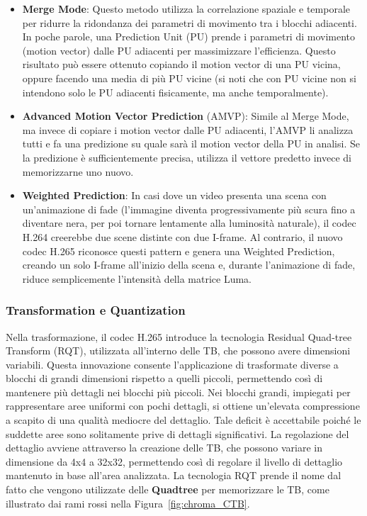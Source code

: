 \documentclass[a4paper,12pt, oneside]{article}
\begin{document}
\begin{itemize}
    \item \textbf{Merge Mode}: Questo metodo utilizza la correlazione spaziale e temporale per ridurre la
    ridondanza dei parametri di movimento tra i blocchi adiacenti. In poche parole, una Prediction Unit
    (PU) prende i parametri di movimento (motion vector) dalle PU adiacenti per massimizzare l'efficienza.
    Questo risultato può essere ottenuto copiando il motion vector di una PU vicina, oppure facendo una
    media di più PU vicine (si noti che con PU vicine non si intendono solo le PU adiacenti fisicamente, ma
    anche temporalmente).
    \item \textbf{Advanced Motion Vector Prediction} (AMVP): Simile al Merge Mode, ma invece di copiare i
    motion vector dalle PU adiacenti, l'AMVP li analizza tutti e fa una predizione su quale sarà il motion
    vector della PU in analisi. Se la predizione è sufficientemente precisa, utilizza il vettore predetto
    invece di memorizzarne uno nuovo.
    \item \textbf{Weighted Prediction}: In casi dove un video presenta una scena con un'animazione di fade
    (l'immagine diventa progressivamente più scura fino a diventare nera, per poi tornare lentamente alla
    luminosità naturale), il codec H.264 creerebbe due scene distinte con due I-frame. Al contrario, il
    nuovo codec H.265 riconosce questi pattern e genera una Weighted Prediction, creando un solo I-frame
    all'inizio della scena e, durante l'animazione di fade, riduce semplicemente l'intensità della matrice
    Luma.
\end{itemize}

\subsubsection{Transformation e Quantization}
Nella trasformazione, il codec H.265 introduce la tecnologia Residual Quad-tree Transform (RQT), utilizzata
all'interno delle TB, che possono avere dimensioni variabili. Questa innovazione consente l'applicazione di
trasformate diverse a blocchi di grandi dimensioni rispetto a quelli piccoli, permettendo così di mantenere
più dettagli nei blocchi più piccoli. Nei blocchi grandi, impiegati per rappresentare aree uniformi con
pochi dettagli, si ottiene un'elevata compressione a scapito di una qualità mediocre del dettaglio. Tale
deficit è accettabile poiché le suddette aree sono solitamente prive di dettagli significativi. La
regolazione del dettaglio avviene attraverso la creazione delle TB, che possono variare in dimensione
da 4x4 a 32x32, permettendo così di regolare il livello di dettaglio mantenuto in base all'area analizzata.
La tecnologia RQT prende il nome dal fatto che vengono utilizzate delle \textbf{Quadtree} per memorizzare
le TB, come illustrato dai rami rossi nella Figura~\ref{fig:chroma_CTB}.
\end{document}

